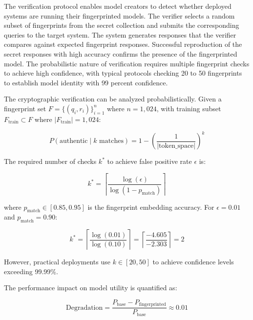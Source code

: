 The verification protocol enables model creators to detect whether deployed systems are running their fingerprinted models. The verifier selects a random subset of fingerprints from the secret collection and submits the corresponding queries to the target system. The system generates responses that the verifier compares against expected fingerprint responses. Successful reproduction of the secret responses with high accuracy confirms the presence of the fingerprinted model. The probabilistic nature of verification requires multiple fingerprint checks to achieve high confidence, with typical protocols checking 20 to 50 fingerprints to establish model identity with 99 percent confidence.

The cryptographic verification can be analyzed probabilistically. Given a fingerprint set $F = \{(q_i, r_i)\}_{i=1}^{n}$ where $n = 1{,}024$, with training subset $F_{\text{train}} \subset F$ where $|F_{\text{train}}| = 1{,}024$:

\begin{equation}
P(\text{authentic} \mid k \text{ matches}) = 1 - \left(\frac{1}{|\text{token\_space}|}\right)^k
\label{eq:verification_confidence}
\end{equation}

The required number of checks $k^*$ to achieve false positive rate $\epsilon$ is:

\begin{equation}
k^* = \left\lceil \frac{\log(\epsilon)}{\log(1 - p_{\text{match}})} \right\rceil
\label{eq:required_checks}
\end{equation}

where $p_{\text{match}} \in [0.85, 0.95]$ is the fingerprint embedding accuracy. For $\epsilon = 0.01$ and $p_{\text{match}} = 0.90$:

\begin{equation}
k^* = \left\lceil \frac{\log(0.01)}{\log(0.10)} \right\rceil = \left\lceil \frac{-4.605}{-2.303} \right\rceil = 2
\label{eq:checks_example}
\end{equation}

However, practical deployments use $k \in [20, 50]$ to achieve confidence levels exceeding 99.99\%.

The performance impact on model utility is quantified as:

\begin{equation}
\text{Degradation} = \frac{P_{\text{base}} - P_{\text{fingerprinted}}}{P_{\text{base}}} \approx 0.01
\label{eq:performance_degradation}
\end{equation}

